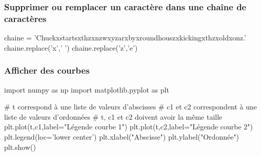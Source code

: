\documentclass[10pt]{article}
\begin{document}
\subsubsection*{Supprimer ou remplacer un caractère dans une chaîne de caractères}
\begin{py}
\begin{python}
chaine = 'Chuckxstartsxthzxnzwxyzarxbyxroundhouszxkickingxthzxoldxonz.'
chaine.replace('x',' ')
chaine.replace('z','e')
\end{python}
\end{py}

\subsubsection*{Afficher des courbes}
\begin{py}
\begin{python}
import numpy as np
import matplotlib.pyplot as plt

# t correspond à une liste de valeurs d'abscisses
# c1 et c2 correspondent à une liste de valeurs d'ordonnées
# t, c1 et c2 doivent avoir la même taille
plt.plot(t,c1,label="Légende courbe 1")
plt.plot(t,c2,label="Légende courbe 2")
plt.legend(loc='lower center')
plt.xlabel("Abscisse")
plt.ylabel("Ordonnée")
plt.show()

\end{python}
\end{py}
\end{document}
